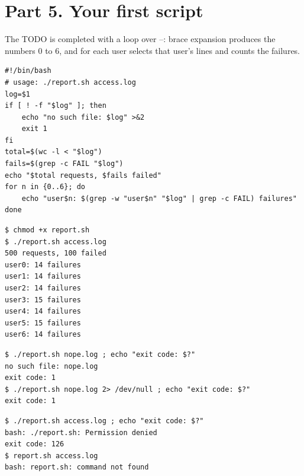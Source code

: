 \documentclass[11pt,a4paper]{article}
\begin{document}
\section{Part 5. Your first script}

The TODO is completed with a loop over --: brace expansion produces
the numbers 0 to 6, and for each user  selects that user's lines and
 counts the failures.

\begin{lstlisting}[caption={Contents of report.sh}]
#!/bin/bash
# usage: ./report.sh access.log
log=$1
if [ ! -f "$log" ]; then
	echo "no such file: $log" >&2
	exit 1
fi
total=$(wc -l < "$log")
fails=$(grep -c FAIL "$log")
echo "$total requests, $fails failed"
for n in {0..6}; do
	echo "user$n: $(grep -w "user$n" "$log" | grep -c FAIL) failures"
done
\end{lstlisting}

\begin{lstlisting}[caption={Running the script on access.log}]
$ chmod +x report.sh
$ ./report.sh access.log
500 requests, 100 failed
user0: 14 failures
user1: 14 failures
user2: 14 failures
user3: 15 failures
user4: 14 failures
user5: 15 failures
user6: 14 failures
\end{lstlisting}

\begin{lstlisting}[caption={Error handling for a missing file}]
$ ./report.sh nope.log ; echo "exit code: $?"
no such file: nope.log
exit code: 1
$ ./report.sh nope.log 2> /dev/null ; echo "exit code: $?"
exit code: 1
\end{lstlisting}

\begin{lstlisting}[caption={Running the script before chmod +x and without ./}]
$ ./report.sh access.log ; echo "exit code: $?"
bash: ./report.sh: Permission denied
exit code: 126
$ report.sh access.log
bash: report.sh: command not found
\end{lstlisting}
\end{document}
